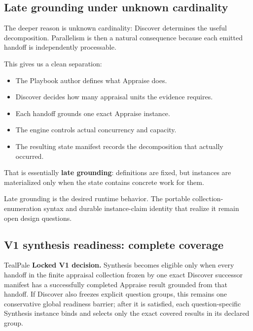 \documentclass[11pt]{article}
\newcommand{\term}[1]{\textbf{#1}}
\begin{document}
\clearpage
\thispagestyle{fancy}
\subsection{Late grounding under unknown cardinality}

The deeper reason is unknown cardinality: Discover determines the useful decomposition. Parallelism is then a natural consequence because each emitted handoff is independently processable.

This gives us a clean separation:

\begin{itemize}
  \item The Playbook author defines what Appraise does.
  \item Discover decides how many appraisal units the evidence requires.
  \item Each handoff grounds one exact Appraise instance.
  \item The engine controls actual concurrency and capacity.
  \item The resulting state manifest records the decomposition that actually occurred.
\end{itemize}

That is essentially \term{late grounding}: definitions are fixed, but instances are materialized only when the state contains concrete work for them.

\begin{warningbox}
Late grounding is the desired runtime behavior. The portable collection-enumeration syntax and durable instance-claim identity that realize it remain open design questions.
\end{warningbox}

\Needspace{3.8in}
\subsection{V1 synthesis readiness: complete coverage}

\begin{decisionbox}{TealPale}
\textbf{Locked V1 decision.} Synthesis becomes eligible only when every handoff in the finite appraisal collection frozen by one exact Discover successor manifest has a successfully completed Appraise result grounded from that handoff. If Discover also freezes explicit question groups, this remains one conservative global readiness barrier; after it is satisfied, each question-specific Synthesis instance binds and selects only the exact covered results in its declared group.
\end{decisionbox}
\end{document}
